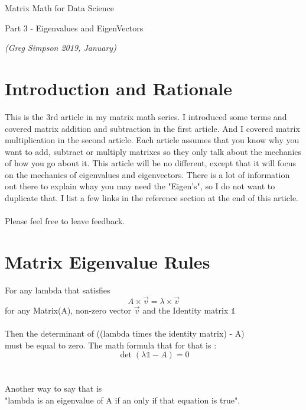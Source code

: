 \documentclass{article}
\begin{document}
\centerline{\sc \large Matrix Math for Data Science }
\vspace{.5pc}
\centerline{\sc Part 3 - Eigenvalues and EigenVectors}
\centerline{\it (Greg Simpson 2019, January)}
\vspace{2pc}


\section{Introduction and Rationale}
This is the 3rd article in my matrix math series. I introduced some terms and covered matrix addition and subtraction in the first article.
And I covered matrix multiplication in the second article.   Each article assumes that you know why you want to add, subtract or multiply matrixes so they only talk about the mechanics of how you go about it.
This article will be no different, except that it will focus on the mechanics of eigenvalues and eigenvectors.  There is a lot of information out there to explain whay you may need the "Eigen's", so I do not want to duplicate that. 
I list a few links in the reference section at the end of this article.
\\
\\
 Please feel free to leave feedback.
\\
\vspace{3pc}




\newpage
\section{Matrix Eigenvalue Rules}
For any lambda that satisfies 
\[
A \times \vec{v} = \lambda \times \vec{v} 
\]
for any Matrix(A), non-zero vector $ \vec{v} $ and the Identity matrix $ \mathbb{1} $
\\
\\
Then the determinant of ((lambda times the identity matrix) - A)
\\
must be equal to zero.  The math formula that for that is :
\[
\det ( \lambda \mathbb{1} - A ) = 0
\] 
\\
\\
Another way to say that is
\\
"lambda is an eigenvalue of A if an only if that equation is true".
\\
\\



\newpage
\end{document}

